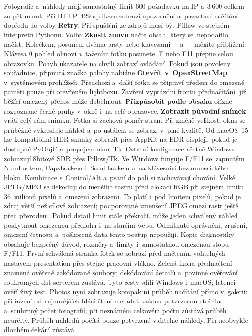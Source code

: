 \documentclass[11pt,a4paper]{article}
\newcommand{\ui}[1]{\textbf{#1}}
\begin{document}
Fotografie a~náhledy mají
samostatný limit 600 požadavků na IP a~3\,600 celkem za pět minut.
Při HTTP~429 aplikace zobrazí upozornění a~pozastaví načítání dopředu do
volby \ui{Retry}. Při spuštění ze zdrojů musí být Pillow ve stejném
interpretu Pythonu. Volba \ui{Zkusit znovu}
načte obsah, který se~nepodařilo načíst. Kolečkem, posunem dvěma prsty nebo
klávesami + a~\ensuremath{-} měníte přiblížení. Klávesa 0 pohled obnoví a~tažením fotku
posunete. F nebo F11 přepne celou obrazovku. Pohyb ukazatele na chvíli zobrazí
ovládání.
Pokud jsou povoleny souřadnice, připnutá značka polohy nabídne
\ui{Otevřít v~OpenStreetMap} v~systémovém prohlížeči. Předchozí a~další
fotka se připraví předem do omezené paměti pouze při otevřeném lightboxu.
Zavření vyprázdní frontu přednačítání; již běžící omezený přenos může doběhnout.
\ui{Přizpůsobit podle obsahu} ořízne rozpoznané černé pruhy v~okně i~na celé
obrazovce. \ui{Zobrazit původní snímek} vrátí celý rám snímku. Fotka si zachová
poměr stran. Při změně velikosti okna se průběžně vykresluje náhled a~po
ustálení se zobrazí v~plné kvalitě. Od macOS~15 lze kompatibilní HDR snímky
zobrazit přes AppKit na EDR displeji, pokud je dostupné PyObjC a~propojení
okna Tk. Ostatní konfigurace včetně Windows zobrazují 8bitové SDR přes
Pillow/Tk.
Ve Windows funguje F/F11 se~zapnutým NumLockem, CapsLockem i~ScrollLockem
a~na klávesnici bez numerického bloku. Kombinace s~Control/Alt a~psaní do polí
si zachovávají chování. Velké JPEG/MPO se dekódují do menšího rastru před
alokací RGB při stejném limitu 36~milionů pixelů a~omezení zobrazení.
To platí i~pod limitem pixelů, pokud je zdroj větší než cílové zobrazení;
podporované zmenšení JPEG omezí rastr ještě před převodem.
Pokud detail limit stále překročí, může jeden schválený náhled poskytnout
omezenou předlohu i~na starším webu. Odmítnuté oprávnění, zrušení, omezení
četnosti a~poškozená data tento postup nepoužijí. Kopie diagnostiky obsahuje
bezpečný důvod, rozměry a~limity i~samostatnou omezenou stopu F/F11.
První schválená stránka fotek se zobrazí před načtením volitelných nastavení
presentation přes stejné pracovní vlákno. Zelená ikona přednačtení znamená
ověřené zakódované soubory; dekódování detailů a~povinné ověřování soukromých
dat serverem zůstává. Tyto cesty sdílí Windows i~macOS; latenci ověří živý test.
Photos nyní zobrazuje kompaktní průběh načítání přímo v~galerii: při řazení
od nejnovějších hlásí čtení metadat každou potvrzenou stránku a~souhrnný počet
fotografií; při neznámém celkovém počtu zůstává průběh neurčitý. Průběh náhledů
počítá pouze potvrzené viditelné náhledy. Při neobvykle dlouhém čekání zůstává
\end{document}
